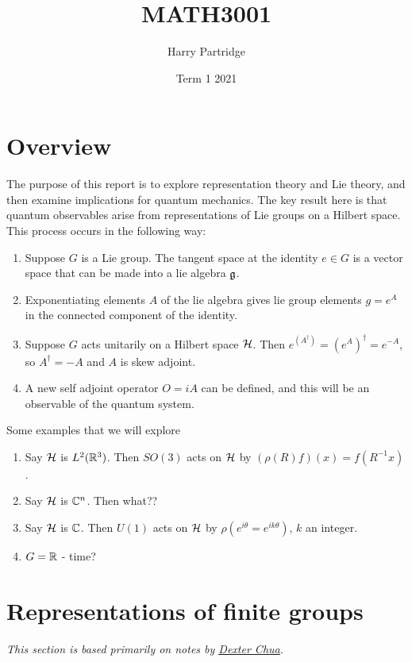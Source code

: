\documentclass[a4paper]{article}
\title{MATH3001}
\author{Harry Partridge}
\date{Term 1 2021}
\begin{document}
\maketitle

\tableofcontents

\newpage
\section{Overview}
The purpose of this report is to explore representation theory and Lie theory, and then examine implications for quantum mechanics. The key result here is that quantum observables arise from representations of Lie groups on a Hilbert space. This process occurs in the following way:
\begin{enumerate}
    \item Suppose $G$ is a Lie group. The tangent space at the identity $e \in G$ is a vector space that can be made into a lie algebra $\mathfrak{g}$. 
    \item Exponentiating elements $A$ of the lie algebra gives lie group elements $g = e^A$ in the connected component of the identity. 
    \item Suppose $G$ acts unitarily on a Hilbert space $\mathcal{H}$. Then $e^{(A^\dagger)} = \left(e^{A}\right)^\dagger = e^{-A}$, so $A^\dagger = -A$ and $A$ is skew adjoint. 
    \item A new self adjoint operator $O = iA$ can be defined, and this will be an observable of the quantum system. 
\end{enumerate}
Some examples that we will explore 
\begin{enumerate}
    \item Say $\mathcal{H}$ is $L^2(\mathbb{R}^3)$. Then $SO(3)$ acts on $\mathcal{H}$ by $(\rho(R)f)(x) = f(R^{-1}x)$.
    \item Say $\mathcal{H}$ is $\mathbb{C}^n$. Then what??
    \item Say $\mathcal{H}$ is $\mathbb{C}$. Then $U(1)$ acts on $\mathcal{H}$ by $\rho(e^{i\theta} = e^{ik\theta})$, $k$ an integer.
    \item $G = \mathbb{R}$ - time?
\end{enumerate}

\section{Representations of finite groups}
\textit{This section is based primarily on notes by \underline{\href{https://dec41.user.srcf.net/notes/II_L/representation_theory.pdf}{Dexter Chua}}.}
\end{document}
